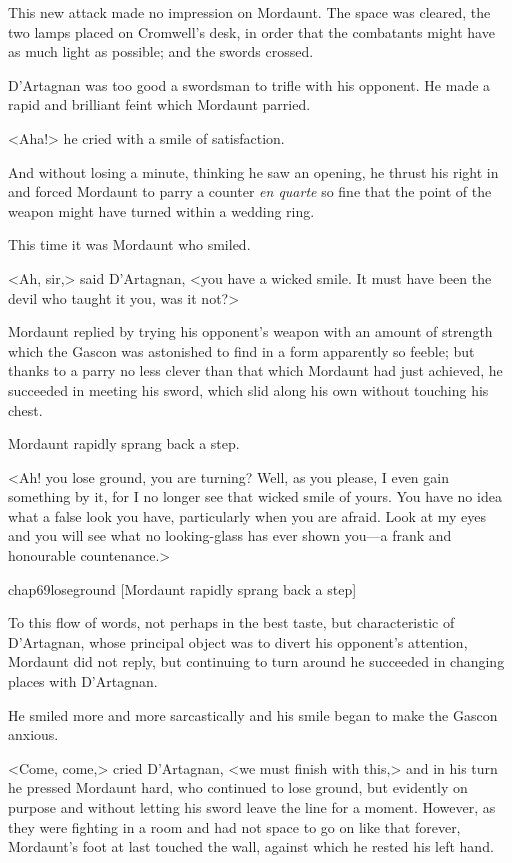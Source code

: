 This new attack made no impression on Mordaunt. The space was cleared, the two lamps placed on Cromwell's desk, in order that the combatants might have as much light as possible; and the swords crossed.

D'Artagnan was too good a swordsman to trifle with his opponent. He made a rapid and brilliant feint which Mordaunt parried.

<Aha!> he cried with a smile of satisfaction.

And without losing a minute, thinking he saw an opening, he thrust his right in and forced Mordaunt to parry a counter \textit{en quarte} so fine that the point of the weapon might have turned within a wedding ring.

This time it was Mordaunt who smiled.

<Ah, sir,> said D'Artagnan, <you have a wicked smile. It must have been the devil who taught it you, was it not?>

Mordaunt replied by trying his opponent's weapon with an amount of strength which the Gascon was astonished to find in a form apparently so feeble; but thanks to a parry no less clever than that which Mordaunt had just achieved, he succeeded in meeting his sword, which slid along his own without touching his chest.

Mordaunt rapidly sprang back a step.

<Ah! you lose ground, you are turning? Well, as you please, I even gain something by it, for I no longer see that wicked smile of yours. You have no idea what a false look you have, particularly when you are afraid. Look at my eyes and you will see what no looking-glass has ever shown you—a frank and honourable countenance.>

\begin{bwbigpic}
	[\basicscale] 
	{chap69loseground}
	[Mordaunt rapidly sprang back a step]
\end{bwbigpic}

To this flow of words, not perhaps in the best taste, but characteristic of D'Artagnan, whose principal object was to divert his opponent's attention, Mordaunt did not reply, but continuing to turn around he succeeded in changing places with D'Artagnan.

He smiled more and more sarcastically and his smile began to make the Gascon anxious.

<Come, come,> cried D'Artagnan, <we must finish with this,> and in his turn he pressed Mordaunt hard, who continued to lose ground, but evidently on purpose and without letting his sword leave the line for a moment. However, as they were fighting in a room and had not space to go on like that forever, Mordaunt's foot at last touched the wall, against which he rested his left hand.

